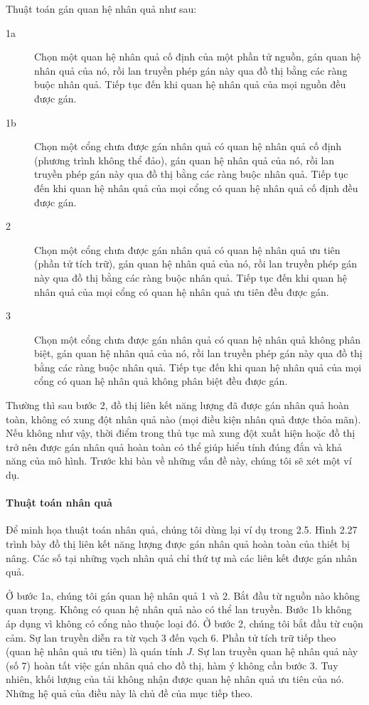 Thuật toán gán quan hệ nhân quả như sau:
\begin{description}
\item[1a] Chọn một quan hệ nhân quả cố định của một phần tử nguồn, gán quan hệ nhân quả của nó, rồi lan truyền phép gán này qua đồ thị bằng các ràng buộc nhân quả. Tiếp tục đến khi quan hệ nhân quả của mọi nguồn đều được gán.
\item[1b] Chọn một cổng chưa được gán nhân quả có quan hệ nhân quả cố định (phương trình không thể đảo), gán quan hệ nhân quả của nó, rồi lan truyền phép gán này qua đồ thị bằng các ràng buộc nhân quả. Tiếp tục đến khi quan hệ nhân quả của mọi cổng có quan hệ nhân quả cố định đều được gán.
\item[2] Chọn một cổng chưa được gán nhân quả có quan hệ nhân quả ưu tiên (phần tử tích trữ), gán quan hệ nhân quả của nó, rồi lan truyền phép gán này qua đồ thị bằng các ràng buộc nhân quả. Tiếp tục đến khi quan hệ nhân quả của mọi cổng có quan hệ nhân quả ưu tiên đều được gán.
\item[3] Chọn một cổng chưa được gán nhân quả có quan hệ nhân quả không phân biệt, gán quan hệ nhân quả của nó, rồi lan truyền phép gán này qua đồ thị bằng các ràng buộc nhân quả. Tiếp tục đến khi quan hệ nhân quả của mọi cổng có quan hệ nhân quả không phân biệt đều được gán.
\end{description}

Thường thì sau bước 2, đồ thị liên kết năng lượng đã được gán nhân quả hoàn toàn, không có xung đột nhân quả nào (mọi điều kiện nhân quả được thỏa mãn). Nếu không như vậy, thời điểm trong thủ tục mà xung đột xuất hiện hoặc đồ thị trở nên được gán nhân quả hoàn toàn có thể giúp hiểu tính đúng đắn và khả năng của mô hình. Trước khi bàn về những vấn đề này, chúng tôi sẽ xét một ví dụ.

\paragraph{Thuật toán nhân quả}
Để minh họa thuật toán nhân quả, chúng tôi dùng lại ví dụ trong 2.5. Hình 2.27 trình bày đồ thị liên kết năng lượng được gán nhân quả hoàn toàn của thiết bị nâng. Các số tại những vạch nhân quả chỉ thứ tự mà các liên kết được gán nhân quả.

Ở bước 1a, chúng tôi gán quan hệ nhân quả 1 và 2. Bắt đầu từ nguồn nào không quan trọng. Không có quan hệ nhân quả nào có thể lan truyền. Bước 1b không áp dụng vì không có cổng nào thuộc loại đó. Ở bước 2, chúng tôi bắt đầu từ cuộn cảm. Sự lan truyền diễn ra từ vạch 3 đến vạch 6. Phần tử tích trữ tiếp theo (quan hệ nhân quả ưu tiên) là quán tính $J$. Sự lan truyền quan hệ nhân quả này (số 7) hoàn tất việc gán nhân quả cho đồ thị, hàm ý không cần bước 3. Tuy nhiên, khối lượng của tải không nhận được quan hệ nhân quả ưu tiên của nó. Những hệ quả của điều này là chủ đề của mục tiếp theo.

